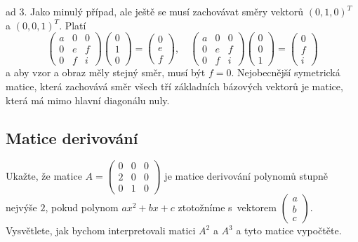 ad 3. Jako minulý případ, ale ještě se musí zachovávat směry vektorů $(0,1,0)^T$ a $(0,0,1)^T$. Platí
\begin{equation*}
    \begin{pmatrix}
    a & 0 & 0 \\ 0 & e & f \\ 0& f& i \end{pmatrix}
  \begin{pmatrix}
    0 \\1\\0
  \end{pmatrix}
  =
  \begin{pmatrix}
    0 \\ e\\f
  \end{pmatrix}
,\quad
    \begin{pmatrix}
    a & 0 & 0 \\ 0 & e & f \\ 0& f& i \end{pmatrix}
  \begin{pmatrix}
    0 \\0\\1
  \end{pmatrix}
  =
  \begin{pmatrix}
    0 \\ f\\i \end{pmatrix}
\end{equation*}
a aby vzor a obraz měly stejný směr, musí být $f=0$. Nejobecnější symetrická matice, která zachovává směr všech tří základních bázových vektorů je matice, která má mimo hlavní diagonálu nuly.
\konec



\stranka

\subsection{Matice derivování}
Ukažte, že matice 
$A=
\begin{pmatrix}
  0 & 0 & 0 \\
  2 & 0 & 0 \\
  0 & 1 & 0
\end{pmatrix}
$
je matice derivování polynomů stupně nejvýše $2$, pokud polynom $ax^2+bx+c$ ztotožníme s vektorem $
\begin{pmatrix}
  a \\ b\\c
\end{pmatrix}
$.  Vysvětlete, jak bychom
interpretovali matici $A^2$ a $A^3$ a tyto matice vypočtěte.


